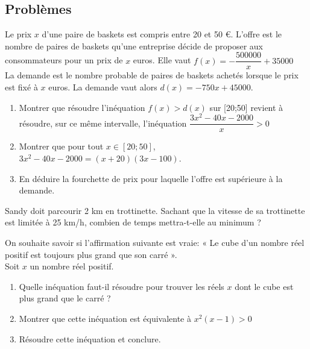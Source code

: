 {\subsection*{Problèmes}

\begin{Exercice} %
Le prix $ x $ d'une paire de baskets est compris entre 20 et 50 €.
L'offre est le nombre de paires de baskets qu'une entreprise décide de proposer aux consommateurs pour un prix de $ x $ euros. Elle vaut $ f(x)=-\dfrac{500000}{x}+35000 $ \\
La demande est le nombre probable de paires de baskets achetés lorsque le prix est fixé à $ x $ euros. La demande vaut alors $ d(x) = -750x + 45000 $.
\begin{enumerate}


\item Montrer que résoudre l'inéquation $ f(x) > d(x) $ sur [20;50] revient à résoudre, sur ce même intervalle, l'inéquation
$ \dfrac{3x^2-40x-2000}{x}>0 $
\item Montrer que pour tout $ x \in [20; 50] $, $ 3x^2-40x-2000 = (x + 20)(3x - 100). $
\item En déduire la fourchette de prix pour laquelle l'offre est supérieure à la demande.
\end{enumerate}
\end{Exercice}

\begin{Exercice} %
Sandy doit parcourir 2 km en trottinette. Sachant que la vitesse de sa trottinette est limitée à 25 km/h, combien de temps mettra-t-elle au minimum ?
\end{Exercice}




\begin{Exercice}
On souhaite savoir si l'affirmation suivante est vraie: « Le cube d'un nombre réel positif est toujours plus grand que son carré ».
\\ Soit $x$ un nombre réel positif.
\begin{enumerate}
	\item Quelle inéquation faut-il résoudre pour trouver les réels $x$ dont le cube est plus grand que le carré ?
	\item Montrer que cette inéquation est équivalente à $x^2(x-1)>0$
	\item Résoudre cette inéquation et conclure.
\end{enumerate}


\end{Exercice}}
